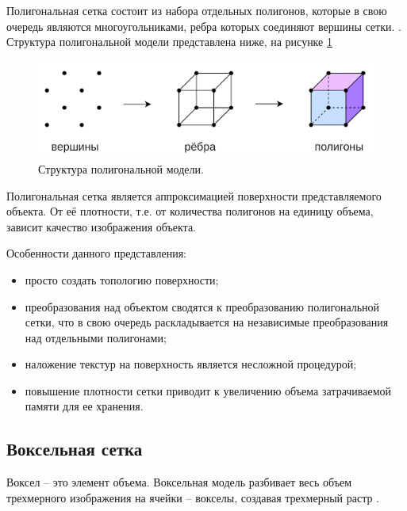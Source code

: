 Полигональная сетка состоит из набора отдельных полигонов, которые в свою очередь являются многоугольниками, ребра которых соединяют вершины сетки. \cite{polygon-net}. Структура полигональной модели представлена ниже, на рисунке \ref{pic:polygon-net}

\begin{figure}[h]
	\centering
	\includegraphics[width=0.8\linewidth]{inc/img/polygon-model.png}
	\caption{Структура полигональной модели.}
	\label{pic:polygon-net}
\end{figure}

Полигональная сетка является аппроксимацией поверхности представляемого объекта. От её плотности, т.е. от количества полигонов на единицу объема, зависит качество изображения объекта.

Особенности данного представления:

\begin{itemize}
	\item просто создать топологию поверхности;
	\item преобразования над объектом сводятся к преобразованию полигональной сетки, что в свою очередь раскладывается на независимые преобразования над отдельными полигонами;
	\item наложение текстур на поверхность является несложной процедурой;
	\item повышение плотности сетки приводит к увеличению объема затрачиваемой памяти для ее хранения.
\end{itemize}

\clearpage

\subsection{Воксельная сетка}

Воксел -- это элемент объема. Воксельная модель разбивает весь объем трехмерного изображения на ячейки -- вокселы, создавая трехмерный растр \cite{voxel}.
